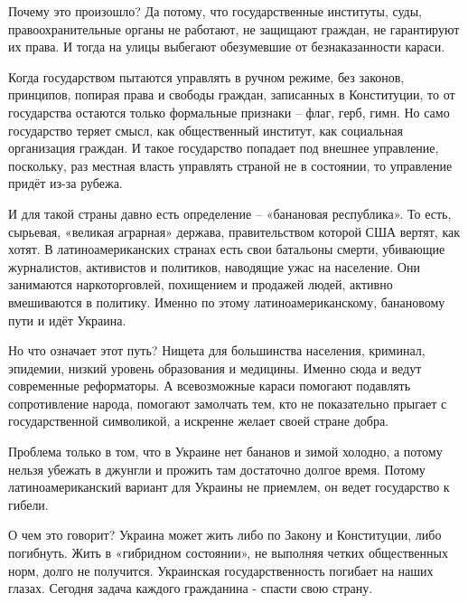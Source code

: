 Почему это произошло? Да потому, что государственные институты, суды,
правоохранительные органы не работают, не защищают граждан, не гарантируют их
права. И тогда на улицы выбегают обезумевшие от безнаказанности караси. 

Когда государством пытаются управлять в ручном режиме, без законов, принципов,
попирая права и свободы граждан, записанных в Конституции, то от государства
остаются только формальные признаки – флаг, герб, гимн. Но само государство
теряет смысл, как общественный институт, как социальная организация граждан. И
такое государство попадает под внешнее управление, поскольку, раз местная
власть управлять страной не в состоянии, то управление придёт из-за рубежа. 

И для такой страны давно есть определение – «банановая республика». То есть,
сырьевая, «великая аграрная» держава, правительством которой США вертят, как
хотят. В латиноамериканских странах есть свои батальоны смерти, убивающие
журналистов, активистов и политиков, наводящие ужас на население. Они
занимаются наркоторговлей, похищением и продажей людей, активно вмешиваются в
политику. Именно по этому латиноамериканскому, банановому пути и идёт Украина. 

Но что означает этот путь? Нищета для большинства населения, криминал,
эпидемии, низкий уровень образования и медицины. Именно сюда и ведут
современные реформаторы. А всевозможные караси помогают подавлять сопротивление
народа, помогают замолчать тем, кто не показательно прыгает с государственной
символикой, а искренне желает своей стране добра. 

Проблема только в том, что в Украине нет бананов и зимой холодно, а потому
нельзя убежать в джунгли и прожить там достаточно долгое время. Потому
латиноамериканский вариант для Украины не приемлем, он ведет государство к
гибели. 

О чем это говорит? Украина может жить либо по Закону и Конституции, либо
погибнуть. Жить в «гибридном состоянии», не выполняя четких общественных норм,
долго не получится. Украинская государственность погибает на наших глазах.
Сегодня задача каждого гражданина - спасти свою страну.
